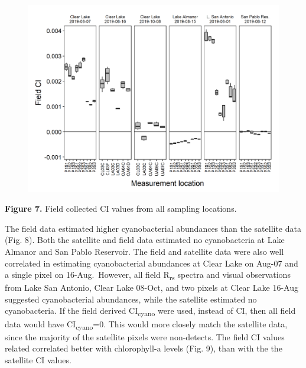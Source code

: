 \documentclass[
]{article}
\begin{document}
\begin{figure}

{\centering \includegraphics[width=27.08in]{../Data/Figures_output/ci_wbd} 

}

\end{figure}

\textbf{Figure 7.} Field collected CI values from all sampling
locations.

The field data estimated higher cyanobacterial abundances than the
satellite data (Fig. 8). Both the satellite and field data estimated no
cyanobacteria at Lake Almanor and San Pablo Reservoir. The field and
satellite data were also well correlated in estimating cyanobacterial
abundances at Clear Lake on Aug-07 and a single pixel on
16-Aug.~However, all field R\textsubscript{rs} spectra and visual
observations from Lake San Antonio, Clear Lake 08-Oct, and two pixels at
Clear Lake 16-Aug suggested cyanobacterial abundances, while the
satellite estimated no cyanobacteria. If the field derived
CI\textsubscript{cyano} were used, instead of CI, then all field data
would have CI\textsubscript{cyano}=0. This would more closely match the
satellite data, since the majority of the satellite pixels were
non-detects. The field CI values related correlated better with
chlorophyll-a levels (Fig. 9), than with the the satellite CI values.
\end{document}

